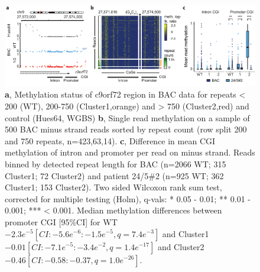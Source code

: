 \begin{figure}[h]
    \centering
    \includegraphics[width=1.0\textwidth]{figures/strique/methylation_bac_region.pdf}
    \captionsetup{format=plain}
    \caption[Nanopore single read methylation in BAC data]{\textbf{a}, Methylation status of c9orf72 region in BAC data for repeats < 200 (WT), 200-750 (Cluster1,orange) and > 750 (Cluster2,red) and control (Hues64, WGBS) \textbf{b}, Single read methylation on a sample of 500 BAC minus strand reads sorted by repeat count (row split 200 and 750 repeats, n=423,63,14). \textbf{c}, Difference in mean CGI methylation of intron and promoter per read on minus strand. Reads binned by detected repeat length for BAC (n=2066 WT; 315 Cluster1; 72 Cluster2) and patient 24/5\#2 (n=925 WT; 362 Cluster1; 153 Cluster2). Two sided Wilcoxon rank sum test, corrected for multiple testing (Holm), q-vals: * 0.05 - 0.01; ** 0.01 - 0.001; *** < 0.001. Median methylation differences between promoter CGI [95\%CI] for WT $-2.3e^{-5} [CI: -5.6e^{-6}:-1.5e^{-5}, q=7.4e^{-3}] $ and Cluster1 $ -0.01 [CI: -7.1e^{-5}:-3.4e^{-2}, q=1.4e^{-17}] $ and Cluster2 $ -0.46 [CI: -0.58:-0.37, q=1.0e^{-26}] $.}
    \label{fig:strique:methylation_bac_region}
\end{figure}

